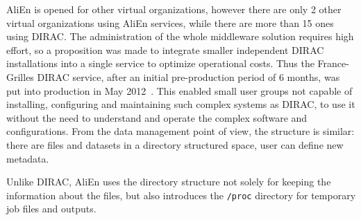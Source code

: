 AliEn is opened for other virtual organizations, however there are only 2 other virtual organizations using 
AliEn services, while there are more than 15 ones using DIRAC. The administration of the whole middleware 
solution requires high effort, so a proposition was made to integrate smaller independent DIRAC installations into 
a single service to optimize operational costs. Thus the France-Grilles DIRAC service, 
after an initial pre-production period of 6 months, was put into production in May 2012~\cite{FGDIRAC}.
This enabled small user groups not capable of installing, configuring and maintaining  
such complex systems as DIRAC, to use it without the need to understand and operate the complex software and
configurations. From the data management point of view, the  structure is similar: there are files and datasets in a 
directory structured space, user can define new metadata.


Unlike DIRAC, AliEn uses the directory structure not solely for keeping the information about the files, 
but also introduces the \texttt{/proc} directory for temporary job files and outputs.